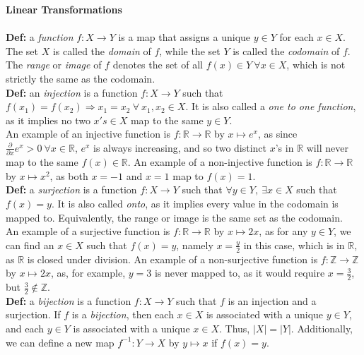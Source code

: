 \documentclass[12pt]{article}
\begin{document}
\textbf{\Large Linear Transformations}
\\\\
\textbf{Def: }a \emph{function} $f: X \rightarrow Y$ is a map that assigns a unique $y \in Y$ for each $x \in X$. The set $X$ is called the \emph{domain} of $f$, while the set $Y$ is called the \emph{codomain} of $f$. The \emph{range} or \emph{image} of $f$ denotes the set of all $f(x) \in Y\  \forall x \in X$, which is not strictly the same as the codomain.\\

\textbf{Def: }an \emph{injection} is a function $f: X \rightarrow Y$ such that $f(x_1) = f(x_2)\Rightarrow x_1 = x_2\ \forall\ x_1, x_2 \in X$. It is also called a \emph{one to one function}, as it implies no two $x's \in X$ map to the same $y \in Y$.\\

An example of an injective function is $f: \mathbb{R} \rightarrow \mathbb{R}$ by $x \mapsto e^{x}$, as since $\frac{\partial}{\partial x}e^x  > 0\ \forall x \in \mathbb{R}$, $e^x$ is always increasing, and so two distinct $x$'s in $\mathbb{R}$ will never map to the same $f(x) \in \mathbb{R}$. An example of a non-injective function is $f: \mathbb{R} \rightarrow \mathbb{R}$ by $x \mapsto x^2$, as both $x = -1$ and $x = 1$ map to $f(x) = 1$. \\

\textbf{Def: }a \emph{surjection} is a function $f: X \rightarrow Y$ such that $\forall y \in Y,\ \exists x \in X$ such that $f(x) = y$. It is also called \emph{onto}, as it implies every value in the codomain is mapped to. Equivalently, the range or image is the same set as the codomain.\\

An example of a surjective function is $f: \mathbb{R} \rightarrow \mathbb{R}$ by $x \mapsto 2x$, as for any $y \in Y$, we can find an $x \in X$ such that $f(x) = y$, namely $x = \frac{y}{2}$ in this case, which is in $\mathbb{R}$, as $\mathbb{R}$ is closed under division. An example of a non-surjective function is $f: \mathbb{Z} \rightarrow \mathbb{Z}$ by $x \mapsto 2x$, as, for example, $y = 3$ is never mapped to, as it would require $x = \frac{3}{2}$, but $\frac{3}{2} \notin \mathbb{Z}$.\\

\textbf{Def: }a \emph{bijection} is a function $f: X \rightarrow Y$ such that $f$ is an injection and a surjection. If $f$ is a \emph{bijection}, then each $x \in X$ is associated with a unique $y \in Y$, and each $y \in Y$ is associated with a unique $x \in X$. Thus, $|X| = |Y|$. Additionally, we can define a new map $f^{-1}: Y \rightarrow X$ by $y \mapsto x$ if $f(x) = y$.\\
\end{document}
